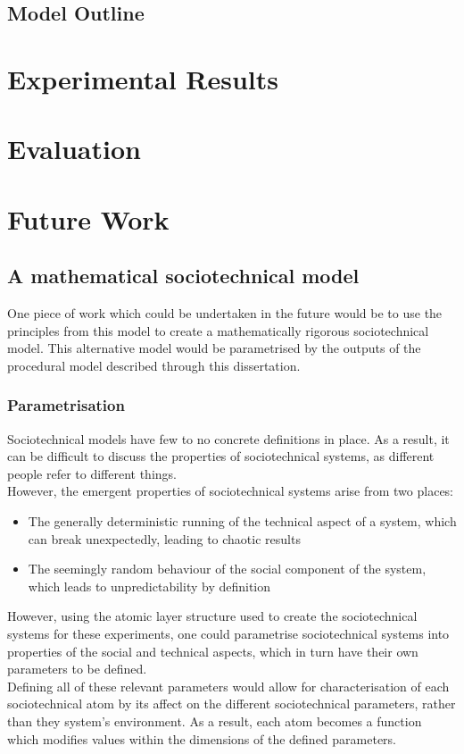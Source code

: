 \documentclass[a4paper]{l4proj}
\begin{document}
\begin{itemize}
\section{Model Outline}
\label{model_outline}



\chapter{Experimental Results}
\label{experimental_results}


\chapter{Evaluation}
\label{evaluation}

\chapter{Future Work}
\label{semantics}
\section{A mathematical sociotechnical model}
One piece of work which could be undertaken in the future would be to use the principles from this model to create a mathematically rigorous sociotechnical model. This alternative model would be parametrised by the outputs of the procedural model described through this dissertation. 
\subsection{Parametrisation}
Sociotechnical models have few to no concrete definitions in place. As a result, it can be difficult to discuss the properties of sociotechnical systems, as different people refer to different things. \\
However, the emergent properties of sociotechnical systems arise from two places:
\begin{itemize}
\item The generally deterministic running of the technical aspect of a system, which can break unexpectedly, leading to chaotic results
\item The seemingly random behaviour of the social component of the system, which leads to unpredictability by definition
\end{itemize}
However, using the atomic layer structure used to create the sociotechnical systems for these experiments, one could parametrise sociotechnical systems into properties of the social and technical aspects, which in turn have their own parameters to be defined.\\
Defining all of these relevant parameters would allow for characterisation of each sociotechnical atom by its affect on the different sociotechnical parameters, rather than they system's environment. As a result, each atom becomes a function which modifies values within the dimensions of the defined parameters. 


\end{itemize}
\end{document}
